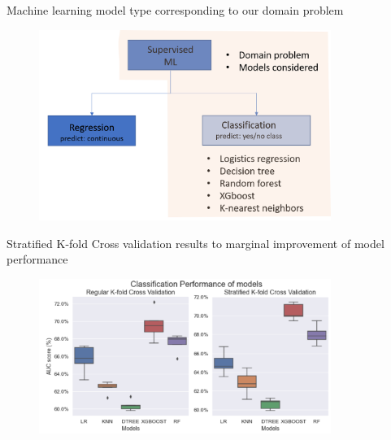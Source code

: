 \begin{frame}{Machine learning model type corresponding to our domain problem}
\begin{figure}
		\includegraphics[width=9.5cm]{figures/fig_model_domain.png}
	\end{figure}
\end{frame}

\begin{frame}{Stratified K-fold Cross validation results to marginal improvement of model performance}

\begin{figure}
		\includegraphics[width=9.50cm]{figures/fig_regular_vs_stratified_kfold.PNG}
	\end{figure}
\end{frame}

